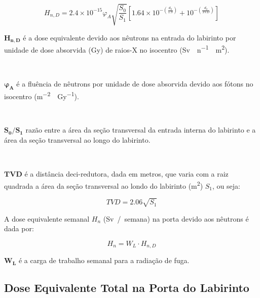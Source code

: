 \documentclass[11pt,a4paper]{article}
\newcounter{exemplo}
\begin{document}
        \begin{equation}
            H_{n,D} = 2.4 \times 10^{-15} \varphi_A \sqrt{\frac{S_0}{S_1}}
            \left[1.64 \times 10^{-\left(\frac{d_2}{1.9}\right)} + 10^{-\left(\frac{d_2}{TVD}\right)}\right]
        \end{equation}

        \begin{exemplo}[onde:]
            \textcolor{CarnationPink}{$\mathbf{H_{n,D}}$} é a dose equivalente devido aos nêutrons na entrada do labirinto por unidade de dose absorvida (Gy) de raios-X no isocentro (\unit{Sv \cdot n^{-1} \cdot m^2}).

            \

            \textcolor{CarnationPink}{$\mathbf{\varphi_A}$} é a fluência de nêutrons por unidade de dose absorvida devido aos fótons no isocentro (\unit{m^{-2} \cdot Gy^{-1}}).

            \

            \textcolor{CarnationPink}{$\mathbf{S_0/S_1}$} razão entre a área da seção transversal da entrada interna do labirinto e a área da seção transversal ao longo do labirinto.

            \

            \textcolor{CarnationPink}{$\mathbf{TVD}$} é a distância deci-redutora, dada em metros, que varia com a raiz quadrada a área da seção transversal ao londo do labirinto (\unit{m^2}) $S_1$, ou seja:

                \begin{equation}
                    TVD = 2.06 \sqrt{S_1}
                \end{equation}
        \end{exemplo}

        A dose equivalente semanal $H_n$ (\unit{Sv / semana}) na porta devido aos nêutrons é dada por:

        \begin{equation}
            H_n = W_L \cdot H_{n,D}
            \label{eq:doseEquivalentenêutrons}
        \end{equation}

        \begin{exemplo}[onde:]
            \textcolor{CarnationPink}{$\mathbf{W_L}$} é a carga de trabalho semanal para a radiação de fuga.
        \end{exemplo}

    \subsection{Dose Equivalente Total na Porta do Labirinto}   
\end{document}

